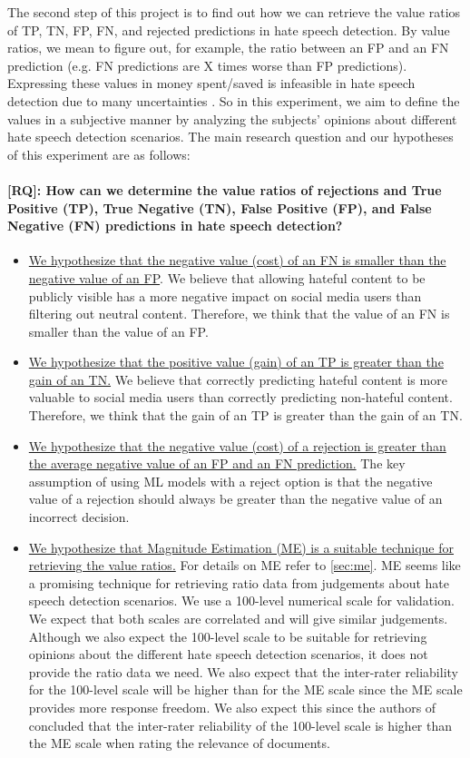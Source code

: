 \documentclass[a4paper]{article}
\begin{document}
The second step of this project is to find out how we can retrieve the value ratios of TP, TN, FP, FN, and rejected predictions in hate speech detection. By value ratios, we mean to figure out, for example, the ratio between an FP and an FN prediction (e.g. FN predictions are X times worse than FP predictions). Expressing these values in money spent/saved is infeasible in hate speech detection due to many uncertainties \cite{sunstein2018does}. So in this experiment, we aim to define the values in a subjective manner by analyzing the subjects' opinions about different hate speech detection scenarios. The main research question and our hypotheses of this experiment are as follows:

\paragraph{[RQ]: How can we determine the value ratios of rejections and True Positive (TP), True Negative (TN), False Positive (FP), and False Negative (FN) predictions in hate speech detection?}
\begin{itemize}
    \item \underline{We hypothesize that the negative value (cost) of an FN is smaller than the negative value of an FP}. We believe that allowing hateful content to be publicly visible has a more negative impact on social media users than filtering out neutral content. Therefore, we think that the value of an FN is smaller than the value of an FP.
    \item \underline{We hypothesize that the positive value (gain) of an TP is greater than the gain of an TN.} We believe that correctly predicting hateful content is more valuable to social media users than correctly predicting non-hateful content. Therefore, we think that the gain of an TP is greater than the gain of an TN.
    \item \underline{We hypothesize that the negative value (cost) of a rejection is greater than the average negative value of an FP and an FN prediction.} The key assumption of using ML models with a reject option is that the negative value of a rejection should always be greater than the negative value of an incorrect decision.
    \item \underline{We hypothesize that Magnitude Estimation (ME) is a suitable technique for retrieving the value ratios.} For details on ME refer to \ref{sec:me}. ME seems like a promising technique for retrieving ratio data from judgements about hate speech detection scenarios. We use a 100-level numerical scale for validation. We expect that both scales are correlated and will give similar judgements. Although we also expect the 100-level scale to be suitable for retrieving opinions about the different hate speech detection scenarios, it does not provide the ratio data we need. We also expect that the inter-rater reliability for the 100-level scale will be higher than for the ME scale since the ME scale provides more response freedom. We also expect this since the authors of \cite{roitero2018fine} concluded that the inter-rater reliability of the 100-level scale is higher than the ME scale when rating the relevance of documents.
\end{itemize}
\end{document}
